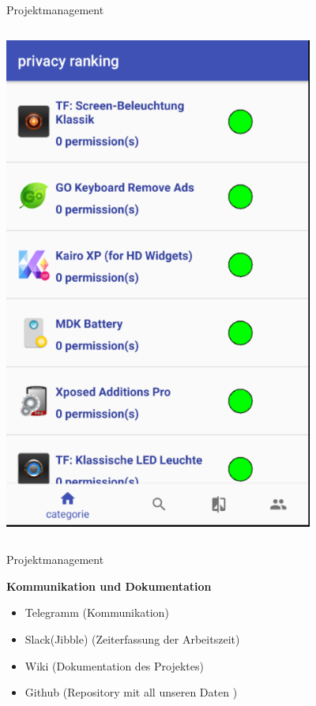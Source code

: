 \documentclass[compress,t]{beamer}
\begin{document}
\begin{frame}{Projektmanagement}
\begin{columns}[t]
        \includegraphics[width=0.8\textwidth]{img/4.png}
    \end{columns}

\end{frame}
\begin{frame}{Projektmanagement}

    \textbf{Kommunikation und Dokumentation}
     \begin{itemize}
          \item Telegramm (Kommunikation)
          \item Slack(Jibble) (Zeiterfassung der Arbeitszeit)
          \item Wiki (Dokumentation des Projektes)
          \item Github (Repository mit all unseren Daten )
    \end{itemize}

\end{frame}
\end{document}
